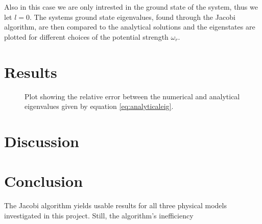 \documentclass[twocolumn]{aastex62}
\begin{document}
Also in this case we are only intrested in the ground state of the system, thus we let $l=0$. The systems ground state eigenvalues, found through the Jacobi algorithm, are then compared to the analytical solutions and the eigenstates are plotted for different choices of the potential strength $\omega_r$.
\section{Results} \label{sec:results}
\begin{figure*}[h]
	\caption{Plot showing the relative error between the numerical and analytical eigenvalues given by equation \ref{eq:analyticaleig}. }
	\label{fig:relerr}
\end{figure*}

\begin{figure*}[h]
	\caption{}
	\label{fig:rhomax}
\end{figure*}


\begin{figure*}[h]
	\caption{}
	\label{fig:eigenstates}
\end{figure*}




\section{Discussion} \label{sec:discussion}

\section{Conclusion} \label{sec:conclusion}
The Jacobi algorithm yields usable results for all three physical models investigated in this project. Still, the algorithm's inefficiency
\
\begin{thebibliography}{}
\end{thebibliography}
\end{document}
